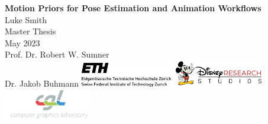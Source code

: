 \documentclass[a4paper,twoside,12pt,chapterprefix=false]{scrbook}
\begin{document}
%


\newcommand{\mfytext}[0]{my fancy text}
\newcommand{\TODO}[1]{\textcolor{red}{TODO: #1}}

\newcommand{\chpref}[1]{Chapter \ref{#1}}
\newcommand{\secref}[1]{Section \ref{#1}}
\newcommand{\figref}[1]{Figure \ref{#1}}
\newcommand{\tabref}[1]{Table \ref{#1}}
\newcommand{\apxref}[1]{Appendix \ref{#1}}

\hypersetup{pageanchor=false} %

%
\begin{titlepage}
	\topmargin 1.0cm
	\oddsidemargin 0.0cm
	\evensidemargin 0.0cm
	\centering
	\Huge
	\vspace{3.0cm}
	\textbf{\textsf{Motion Priors for Pose Estimation and Animation Workflows}} \\[2.0cm]
	\vspace{5.0cm}
	\sffamily
	\Large
	Luke Smith
	\\[0.8cm]
	\large
	Master Thesis
	\\
	May 2023
	\\[1.3cm]
	Prof. Dr. Robert W. Sumner \\
	Dr. Jakob Buhmann
	\vfill
	\includegraphics*[width=0.3\textwidth]{Figures/ETH_logo} \hfill
	\includegraphics*[width=0.3\textwidth]{Figures/Disney_logo.png} \hfill
	\includegraphics*[width=0.3\textwidth]{Figures/CGL_logo}
	\vspace{3.4cm}
\end{titlepage}
\clearemptydoublepage
\end{document}
